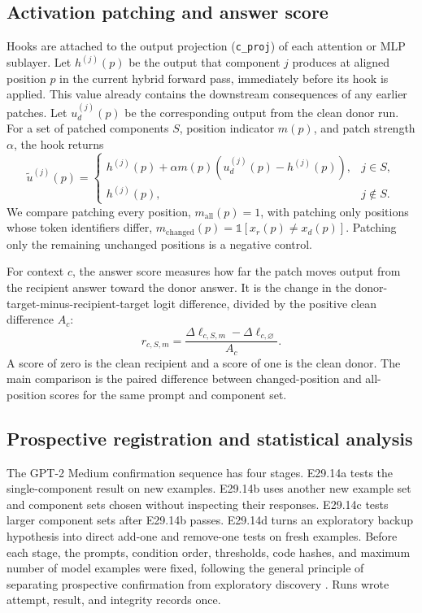 \documentclass[pdflatex,sn-nature]{sn-jnl}
\begin{document}
\subsection{Activation patching and answer score}

Hooks are attached to the output projection (\texttt{c\_proj}) of each attention
or MLP sublayer. Let $h^{(j)}(p)$ be the output that component $j$ produces at
aligned position $p$ in the current hybrid forward pass, immediately before
its hook is applied. This value already contains the downstream consequences
of any earlier patches. Let $u_d^{(j)}(p)$ be the corresponding output from the
clean donor run. For a set of patched components $S$, position indicator
$m(p)$, and patch strength $\alpha$, the hook returns
\begin{equation}
\tilde u^{(j)}(p)=
\begin{cases}
h^{(j)}(p)+\alpha m(p)\left(u_d^{(j)}(p)-h^{(j)}(p)\right), & j\in S,\\
h^{(j)}(p), & j\notin S.
\end{cases}
\label{eq:patch}
\end{equation}
We compare patching every position, $m_{\mathrm{all}}(p)=1$, with patching only
positions whose token identifiers differ,
$m_{\mathrm{changed}}(p)=\mathbb{1}[x_r(p)\ne x_d(p)]$. Patching only the
remaining unchanged positions is a negative control.

For context $c$, the answer score measures how far the patch moves output from
the recipient answer toward the donor answer. It is the change in the
donor-target-minus-recipient-target logit difference, divided by the positive
clean difference $A_c$:
\begin{equation}
r_{c,S,m}=\frac{\Delta\ell_{c,S,m}-\Delta\ell_{c,\varnothing}}{A_c}.
\label{eq:response}
\end{equation}
A score of zero is the clean recipient and a score of one is the clean donor.
The main comparison is the paired difference between changed-position and
all-position scores for the same prompt and component set.

\subsection{Prospective registration and statistical analysis}

The GPT-2 Medium confirmation sequence has four stages. E29.14a tests the
single-component result on new examples. E29.14b uses another new example set
and component sets chosen without inspecting their responses. E29.14c tests
larger component sets after E29.14b passes. E29.14d turns an exploratory backup
hypothesis into direct add-one and remove-one tests on fresh examples. Before
each stage, the prompts, condition order, thresholds, code hashes, and maximum
number of model examples were fixed, following the general principle of
separating prospective confirmation from exploratory discovery
\citep{nosek2018preregistration}. Runs wrote attempt, result, and integrity
records once.
\end{document}
